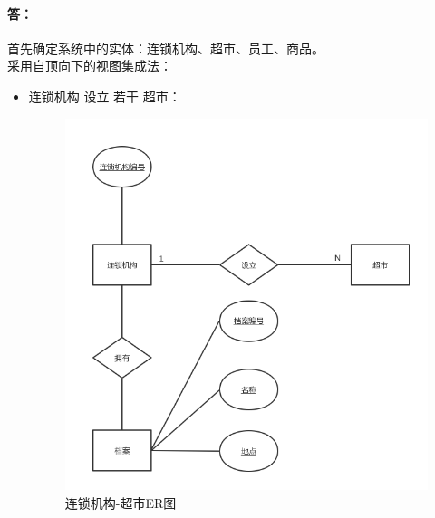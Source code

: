 \paragraph{答：}
首先确定系统中的实体：连锁机构、超市、员工、商品。 \\
采用自顶向下的视图集成法：
\begin{itemize}
	\item 连锁机构 设立 若干 超市：
	\begin{figure}[H]
		\centering
		\includegraphics[width=\textwidth]{11}
		\caption{连锁机构-超市ER图}
		\label{fig:1}
	\end{figure}


\end{itemize}
